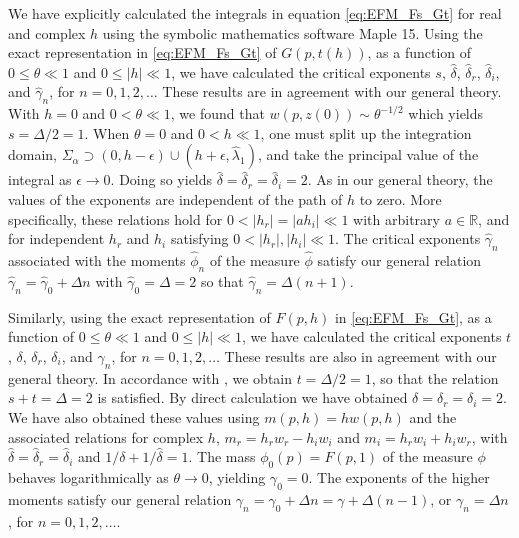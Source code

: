 \documentclass[english,12pt,jmp,graphicx]{revtex4-1}
\newcommand{\ph}{\hat{\phi}}
\newcommand{\gh}{\hat{\gamma}}
\newcommand{\dha}{\hat{\delta}}
\begin{document}
We have explicitly calculated the integrals in equation 
\eqref{eq:EFM_Fs_Gt} for real and complex $h$ using the symbolic
mathematics software Maple 15. Using the exact representation in 
\eqref{eq:EFM_Fs_Gt} of $G(p,t(h))$, as a function of $0\leq\theta\ll1$ and
$0\leq|h|\ll1$, we have calculated the critical exponents
$s$, $\dha$, $\dha_r$, $\dha_i$, and $\gh_n$, for $n=0,1,2,\ldots$ These
results are in agreement with our general theory. With $h=0$ and
$0<\theta\ll1$, we found that $w(p,z(0))\sim\theta^{-1/2}$ which yields
$s=\Delta/2=1$. When $\theta=0$ and $0<h\ll1$, one must split up the integration
domain, $\Sigma_\alpha\supset(0,h-\epsilon)\cup(h+\epsilon,\hat{\lambda}_1)$, and take the principal value of
the integral as $\epsilon\to0$. Doing so yields $\dha=\dha_r=\dha_i=2$. As in
our general theory, the values of the exponents are independent of the
path of $h$ to zero. More 
specifically, these relations hold for $0<|h_r|=|ah_i|\ll1$ with
arbitrary $a\in\mathbb{R}$, and for independent $h_r$ and $h_i$
satisfying $0<|h_r|,|h_i|\ll1$. The critical exponents $\gh_n$
associated with the moments $\ph_n$ of the measure $\ph$ satisfy our
general relation $\gh_n=\gh_0+\Delta n$ with $\gh_0=\Delta=2$ so that
$\gh_n=\Delta(n+1)$.%

Similarly, using the exact representation of $F(p,h)$ in \eqref{eq:EFM_Fs_Gt},
as a function of $0\leq\theta\ll1$ and $0\leq|h|\ll1$, we have calculated the
critical exponents $t$, $\delta$, $\delta_r$,
$\delta_i$, and $\gamma_n$, for $n=0,1,2,\ldots$ These results are also in agreement
with our general theory. In accordance with \cite{Day:JPCM-96}, we
obtain $t=\Delta/2=1$, so that the relation $s+t=\Delta=2$ is
satisfied. By direct calculation we have obtained $\delta=\delta_r=\delta_i=2$. We
have also obtained these values using $m(p,h)=hw(p,h)$ and the
associated relations for complex $h$, $m_r=h_rw_r-h_iw_i$ and
$m_i=h_rw_i+h_iw_r$, with $\dha=\dha_r=\dha_i$ and $1/\delta+1/\dha=1$.
The mass $\phi_0(p)=F(p,1)$ of the measure $\phi$ behaves
logarithmically as $\theta\to0$, yielding $\gamma_0=0$. The exponents of
the higher moments satisfy our general relation
$\gamma_n=\gamma_0+\Delta n=\gamma+\Delta(n-1)$, or $\gamma_n=\Delta n$, for $n=0,1,2,\ldots$. 
\end{document}
